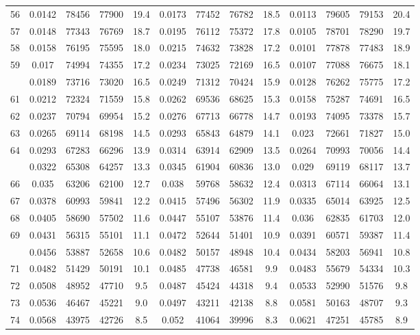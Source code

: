 \documentclass[
  14pt,
]{article}
\begin{document}
\begin{longtable}[t]{lcccccccccccc}
56 & 0.0142 & 78456 & 77900 & 19.4 & 0.0173 & 77452 & 76782 & 18.5 & 0.0113 & 79605 & 79153 & 20.4\\
57 & 0.0148 & 77343 & 76769 & 18.7 & 0.0195 & 76112 & 75372 & 17.8 & 0.0105 & 78701 & 78290 & 19.7\\
58 & 0.0158 & 76195 & 75595 & 18.0 & 0.0215 & 74632 & 73828 & 17.2 & 0.0101 & 77878 & 77483 & 18.9\\
59 & 0.017 & 74994 & 74355 & 17.2 & 0.0234 & 73025 & 72169 & 16.5 & 0.0107 & 77088 & 76675 & 18.1\\
\addlinespace
60 & 0.0189 & 73716 & 73020 & 16.5 & 0.0249 & 71312 & 70424 & 15.9 & 0.0128 & 76262 & 75775 & 17.2\\
61 & 0.0212 & 72324 & 71559 & 15.8 & 0.0262 & 69536 & 68625 & 15.3 & 0.0158 & 75287 & 74691 & 16.5\\
62 & 0.0237 & 70794 & 69954 & 15.2 & 0.0276 & 67713 & 66778 & 14.7 & 0.0193 & 74095 & 73378 & 15.7\\
63 & 0.0265 & 69114 & 68198 & 14.5 & 0.0293 & 65843 & 64879 & 14.1 & 0.023 & 72661 & 71827 & 15.0\\
64 & 0.0293 & 67283 & 66296 & 13.9 & 0.0314 & 63914 & 62909 & 13.5 & 0.0264 & 70993 & 70056 & 14.4\\
\addlinespace
65 & 0.0322 & 65308 & 64257 & 13.3 & 0.0345 & 61904 & 60836 & 13.0 & 0.029 & 69119 & 68117 & 13.7\\
66 & 0.035 & 63206 & 62100 & 12.7 & 0.038 & 59768 & 58632 & 12.4 & 0.0313 & 67114 & 66064 & 13.1\\
67 & 0.0378 & 60993 & 59841 & 12.2 & 0.0415 & 57496 & 56302 & 11.9 & 0.0335 & 65014 & 63925 & 12.5\\
68 & 0.0405 & 58690 & 57502 & 11.6 & 0.0447 & 55107 & 53876 & 11.4 & 0.036 & 62835 & 61703 & 12.0\\
69 & 0.0431 & 56315 & 55101 & 11.1 & 0.0472 & 52644 & 51401 & 10.9 & 0.0391 & 60571 & 59387 & 11.4\\
\addlinespace
70 & 0.0456 & 53887 & 52658 & 10.6 & 0.0482 & 50157 & 48948 & 10.4 & 0.0434 & 58203 & 56941 & 10.8\\
71 & 0.0482 & 51429 & 50191 & 10.1 & 0.0485 & 47738 & 46581 & 9.9 & 0.0483 & 55679 & 54334 & 10.3\\
72 & 0.0508 & 48952 & 47710 & 9.5 & 0.0487 & 45424 & 44318 & 9.4 & 0.0533 & 52990 & 51576 & 9.8\\
73 & 0.0536 & 46467 & 45221 & 9.0 & 0.0497 & 43211 & 42138 & 8.8 & 0.0581 & 50163 & 48707 & 9.3\\
74 & 0.0568 & 43975 & 42726 & 8.5 & 0.052 & 41064 & 39996 & 8.3 & 0.0621 & 47251 & 45785 & 8.9\\

\end{longtable}
\end{document}
